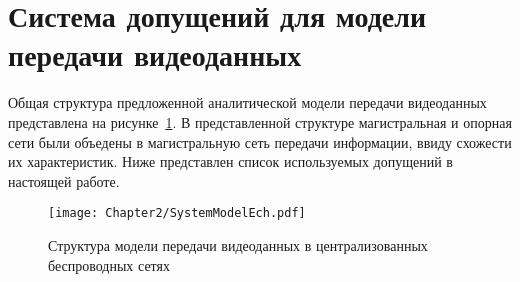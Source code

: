 \section{Система допущений для модели передачи видеоданных}
\label{chap2:Assumptions}

Общая структура предложенной аналитической модели передачи видеоданных представлена на рисунке~\ref{fig:SystemModel}. В представленной структуре магистральная и опорная сети были объедены в магистральную сеть передачи информации, ввиду схожести их характеристик. Ниже представлен список используемых допущений в настоящей работе.

\begin{figure}[htbp]
\begin{center}
\texttt{[image: Chapter2/SystemModelEch.pdf]}
\caption{Структура модели передачи видеоданных в централизованных беспроводных сетях}
\label{fig:SystemModel}
\end{center}
\end{figure}

